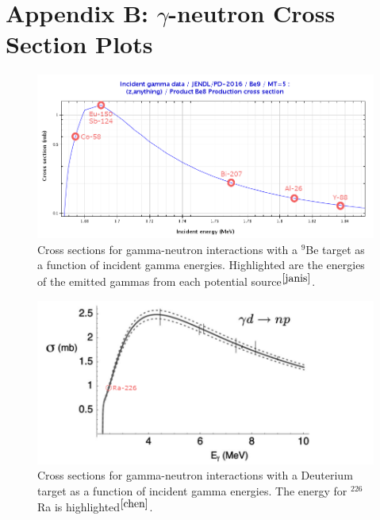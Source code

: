 \documentclass[%
12pt,
twoside,
reprint,
amsmath,amssymb,
aps,
]{article}
\begin{document}
	\section*{Appendix B: $\gamma$-neutron Cross Section Plots}
	
	\begin{figure}[H]
		\includegraphics[scale = 2.5, center]{Images/be_plot.png}
		\caption{\label{tab:table-name} Cross sections for gamma-neutron interactions with a $^{9}$Be target as a function of incident gamma energies. Highlighted are the energies of the emitted gammas from each potential source$^{\cite{janis}}$.}
	\end{figure}

	\begin{figure}[H]
		\includegraphics[scale = 1.8, center]{Images/deuterium_cross_section.png}
		\caption{\label{tab:table-name} Cross sections for gamma-neutron interactions with a Deuterium target as a function of incident gamma energies. The energy for $^{226}$Ra is highlighted$^{\cite{chen}}$.}
	\end{figure}

\end{document}
